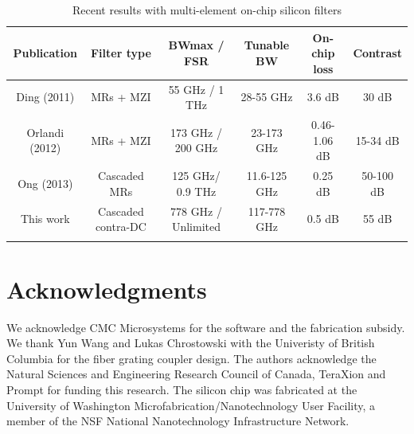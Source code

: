 \documentclass[osajnl,twocolumn,showpacs,superscriptaddress,10pt]{revtex4-1}
\begin{document}
\begin{table}[t]
\caption{Recent results with multi-element on-chip silicon filters}
\begin{tabular}{cccccc}
    \hline
	Publication & Filter type & BWmax / FSR & Tunable BW & On-chip loss & Contrast \\
    \hline
    Ding (2011)\cite{ding2011bandwidth} &	MRs + MZI &	55 GHz / 1 THz &	28-55 GHz &	3.6 dB &	30 dB
     \\
 	Orlandi (2012)\cite{orlandi2012reconfigurable} &	MRs + MZI &	173 GHz / 200 GHz &	23-173 GHz &	0.46-1.06 dB &	15-34 dB
      \\
    Ong (2013)\cite{ong2013ultra} &	Cascaded MRs &	125 GHz/ 0.9 THz &	11.6-125 GHz &	0.25 dB &	50-100 dB
      \\
    This work & Cascaded contra-DC &	778 GHz / Unlimited  &	117-778 GHz &	0.5 dB &	55 dB \\
    
    \hline
    \label{table:comparison}
   \end{tabular}
    \end{table}





\section*{Acknowledgments}
We acknowledge CMC Microsystems for the  software and the fabrication subsidy. We thank Yun Wang and Lukas Chrostowski with the Univeristy of British Columbia for the fiber grating coupler design. The authors acknowledge the Natural Sciences and Engineering Research Council of Canada, TeraXion and Prompt for funding this research. The silicon chip was fabricated at the University of Washington Microfabrication/Nanotechnology User Facility, a member of the NSF National Nanotechnology Infrastructure Network.



\end{document}

